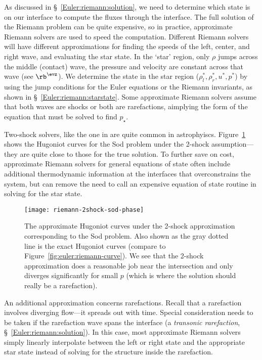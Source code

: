 As discussed in \S~\ref{Euler:riemann:solution}, we need to determine
which state is on our interface to compute the fluxes through the
interface.  The full solution of the Riemann problem can be quite expensive,
so in practice, approximate Riemann solvers are used to speed
the computation.  Different Riemann solvers
will have different approximations for finding the speeds of the left,
center, and right wave, and evaluating the star state.  In the `star'
region, only $\rho$ jumps across the middle (contact) wave, the
pressure and velocity are constant across that wave (see $\rb^\evz$).
We determine the state in the star region ($\rho_l^*, \rho_r^*, u^*,
p^*$) by using the jump conditions for the Euler equations or the
Riemann invariants, as shown in \S~\ref{Euler:riemann:starstate}.
Some approximate Riemann solvers assume that both waves are shocks or
both are rarefactions, aimplying the form of the equation that
must be solved to find $p_\star$.

Two-shock solvers, like the one in \cite{colellaglaz:1985} are quite
common in astrophyiscs.  Figure~\ref{fig:euler:riemann-2shock-curve}
shows the Hugoniot curves for the Sod problem under the 2-shock
assumption---they are quite close to those for the true solution.  To
further save on cost, approximate Riemann solvers for general
equations of state often include additional thermodynamic information
at the interfaces that overconstrains the system, but can remove the
need to call an expensive equation of state routine in solving for the
star state.


\begin{figure}[t]
\centering
\texttt{[image: riemann-2shock-sod-phase]}
\caption[The approximate (2-shock) Hugoniot curves corresponding to
  the Sod problem]{\label{fig:euler:riemann-2shock-curve} The
  approximate Hugoniot curves under the 2-shock approximation
  corresponding to the Sod problem.  Also shown as the gray dotted
  line is the exact Hugoniot curves (compare to
  Figure~\ref{fig:euler:riemann-curve}).  We see that the 2-shock
  approximation does a reasonable job near the intersection and only
  diverges significantly for small $p$ (which is where the solution
  should really be a
  rarefaction).\\
  }
\end{figure}

An additional approximation concerns rarefactions.  Recall that a
rarefaction involves diverging flow---it spreads out with time.
Special consideration needs to be taken if the rarefaction wave spans
the interface (a {\em transonic rarefaction},
\S~\ref{Euler:riemann:solution}).  In this case, most approximate
Riemann solvers simply linearly interpolate between the left or right
state and the appropriate star state instead of solving for the
structure inside the rarefaction.


